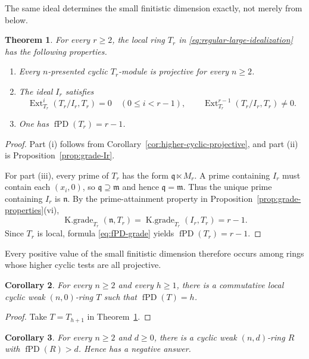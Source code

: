 \documentclass[11pt]{amsart}
\numberwithin{equation}{section}
\newtheorem{theorem}{Theorem}[section]
\newtheorem{corollary}[theorem]{Corollary}
\theoremstyle{definition}
\theoremstyle{remark}
\newcommand{\fPD}{\operatorname{fPD}}
\newcommand{\Ext}{\operatorname{Ext}}
\newcommand{\Kgr}{\operatorname{K.grade}}
\begin{document}
The same ideal determines the small finitistic dimension exactly, not merely from below.

\begin{theorem}\label{thm:exact-cyclic-example}
For every $r\geq2$, the local ring $T_r$ in \eqref{eq:regular-large-idealization} has the following properties.
\begin{enumerate}[label=\textup{(\roman*)}]
\item Every $n$-presented cyclic $T_r$-module is projective for every $n\geq2$.
\item The ideal $I_r$ satisfies
\[
 \Ext_{T_r}^i(T_r/I_r,T_r)=0\quad(0\leq i<r-1),
 \qquad
 \Ext_{T_r}^{r-1}(T_r/I_r,T_r)\neq0.
\]
\item One has $\fPD(T_r)=r-1$.
\end{enumerate}
\end{theorem}

\begin{proof}
Part (i) follows from Corollary~\ref{cor:higher-cyclic-projective}, and part (ii) is Proposition~\ref{prop:grade-Ir}.

For part (iii), every prime of $T_r$ has the form $\mathfrak q\ltimes M_r$.  A prime containing $I_r$ must contain each $(x_i,0)$, so $\mathfrak q\supseteq\mathfrak m$ and hence $\mathfrak q=\mathfrak m$.  Thus the unique prime containing $I_r$ is $\mathfrak n$.  By the prime-attainment property in Proposition~\ref{prop:grade-properties}(vi),
\[
 \Kgr_{T_r}(\mathfrak n,T_r)
 =\Kgr_{T_r}(I_r,T_r)=r-1.
\]
Since $T_r$ is local, formula \eqref{eq:fPD-grade} yields $\fPD(T_r)=r-1$.
\end{proof}

Every positive value of the small finitistic dimension therefore occurs among rings whose higher cyclic tests are all projective.

\begin{corollary}\label{cor:prescribed-fPD}
For every $n\geq2$ and every $h\geq1$, there is a commutative local cyclic weak $(n,0)$-ring $T$ such that $\fPD(T)=h$.
\end{corollary}

\begin{proof}
Take $T=T_{h+1}$ in Theorem~\ref{thm:exact-cyclic-example}.
\end{proof}

\begin{corollary}\label{cor:negative-Mahdou-question}
For every $n\geq2$ and $d\geq0$, there is a cyclic weak $(n,d)$-ring $R$ with $\fPD(R)>d$.  Hence \cite[Open Question~3.8]{ZhangIII} has a negative answer.
\end{corollary}
\end{document}
